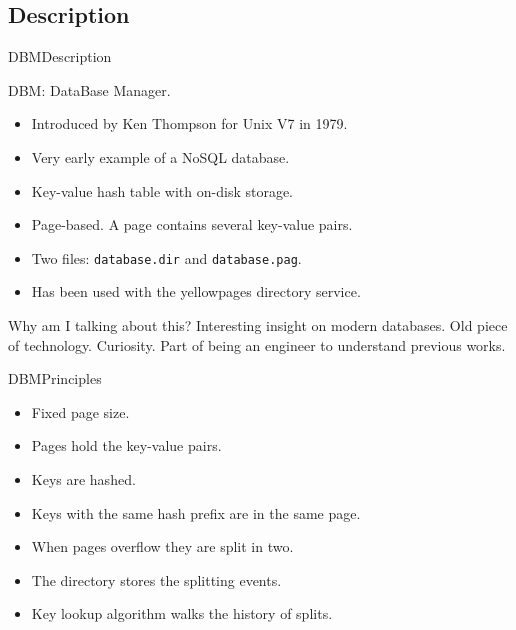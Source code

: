 \documentclass{beamer}
\begin{document}
\subsection{Description}

\begin{frame}{DBM}{Description}

DBM: DataBase Manager.
\begin{itemize}
\item Introduced by Ken Thompson for Unix V7 in 1979.
\item Very early example of a NoSQL database.
\item Key-value hash table with on-disk storage.
\item Page-based. A page contains several key-value pairs.
\item Two files: \texttt{database.dir} and \texttt{database.pag}.
\item Has been used with the yellowpages directory service.
\end{itemize}

\begin{block}{Why am I talking about this?}
Interesting insight on modern databases. Old piece of technology. Curiosity.
Part of being an engineer to understand previous works.
\end{block}

\end{frame}

\begin{frame}{DBM}{Principles}
\begin{itemize}
\item Fixed page size.
\item Pages hold the key-value pairs.
\item Keys are hashed.
\item Keys with the same hash prefix are in the same page.
\item When pages overflow they are split in two.
\item The directory stores the splitting events.
\item Key lookup algorithm walks the history of splits.
\end{itemize}
\end{frame}
\end{document}
